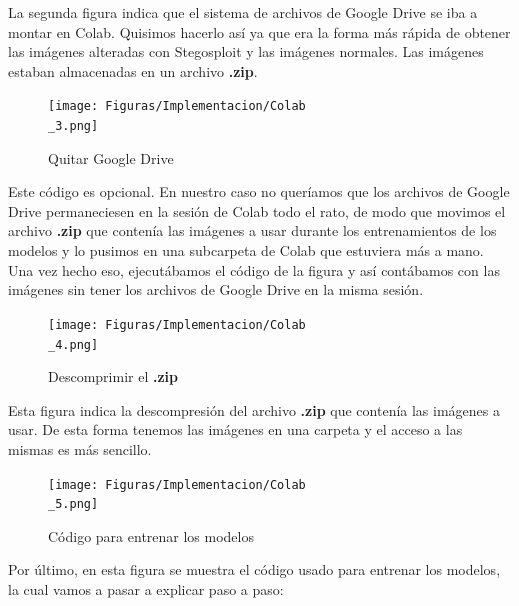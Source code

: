 La segunda figura indica que el sistema de archivos de Google Drive se iba a montar en Colab. Quisimos hacerlo así ya que era la forma más rápida de obtener las imágenes alteradas con Stegosploit y las imágenes normales. Las imágenes estaban almacenadas en un archivo \textbf{.zip}.

\begin{figure}[H]
  \centering
  \texttt{[image: Figuras/Implementacion/Colab\\\_3.png]}
  \label{fig:colab-3}
  \caption{Quitar Google Drive}
\end{figure}

Este código es opcional. En nuestro caso no queríamos que los archivos de Google Drive permaneciesen en la sesión de Colab todo el rato, de modo que movimos el archivo \textbf{.zip} que contenía las imágenes a usar durante los entrenamientos de los modelos y lo pusimos en una subcarpeta de Colab que estuviera más a mano. Una vez hecho eso, ejecutábamos el código de la figura y así contábamos con las imágenes sin tener los archivos de Google Drive en la misma sesión.

\begin{figure}[H]
  \centering
  \texttt{[image: Figuras/Implementacion/Colab\\\_4.png]}
  \label{fig:colab-4}
  \caption{Descomprimir el \textbf{.zip}}
\end{figure}

Esta figura indica la descompresión del archivo \textbf{.zip} que contenía las imágenes a usar. De esta forma tenemos las imágenes en una carpeta y el acceso a las mismas es más sencillo.

\begin{figure}[H]
  \centering
  \texttt{[image: Figuras/Implementacion/Colab\\\_5.png]}
  \label{fig:colab-5}
  \caption{Código para entrenar los modelos}
\end{figure}

Por último, en esta figura se muestra el código usado para entrenar los modelos, la cual vamos a pasar a explicar paso a paso:

